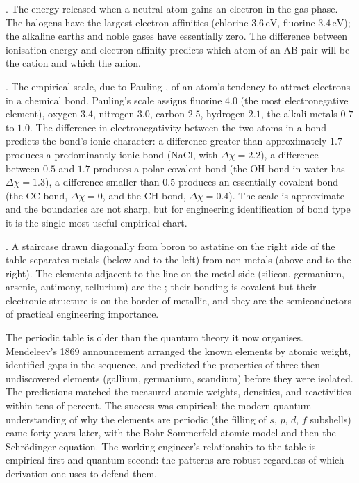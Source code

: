 . The energy released when a neutral atom
gains an electron in the gas phase. The halogens have the largest
electron affinities (chlorine $3.6\,\text{eV}$, fluorine $3.4\,
\text{eV}$); the alkaline earths and noble gases have essentially
zero. The difference between ionisation energy and electron affinity
predicts which atom of an AB pair will be the cation and which the
anion.

. The empirical scale, due to Pauling
\cite[ch.~3]{hist:pauling1960}, of an atom's tendency to attract
electrons in a chemical bond. Pauling's scale assigns fluorine $4.0$
(the most electronegative element), oxygen $3.4$, nitrogen $3.0$,
carbon $2.5$, hydrogen $2.1$, the alkali metals $0.7$ to $1.0$. The
difference in electronegativity between the two atoms in a bond
predicts the bond's ionic character: a difference greater than
approximately $1.7$ produces a predominantly ionic bond (NaCl, with
$\Delta\chi = 2.2$), a difference between $0.5$ and $1.7$ produces a
polar covalent bond (the OH bond in water has $\Delta\chi = 1.3$), a
difference smaller than $0.5$ produces an essentially covalent bond
(the CC bond, $\Delta\chi = 0$, and the CH bond, $\Delta\chi = 0.4$).
The scale is approximate and the boundaries are not sharp, but for
engineering identification of bond type it is the single most useful
empirical chart.

. A staircase drawn diagonally from
boron to astatine on the right side of the table separates metals
(below and to the left) from non-metals (above and to the right). The
elements adjacent to the line on the metal side (silicon, germanium,
arsenic, antimony, tellurium) are the ; their
bonding is covalent but their electronic structure is on the border
of metallic, and they are the semiconductors of practical engineering
importance.

The periodic table is older than the quantum theory it now organises.
Mendeleev's 1869 announcement \cite{hist:mendeleev1869} arranged the
known elements by atomic weight, identified gaps in the sequence, and
predicted the properties of three then-undiscovered elements (gallium,
germanium, scandium) before they were isolated. The predictions matched
the measured atomic weights, densities, and reactivities within tens
of percent. The success was empirical: the modern quantum
understanding of why the elements are periodic (the filling of $s$,
$p$, $d$, $f$ subshells) came forty years later, with the
Bohr-Sommerfeld atomic model and then the Schr\"odinger equation. The
working engineer's relationship to the table is empirical first and
quantum second: the patterns are robust regardless of which derivation
one uses to defend them.

